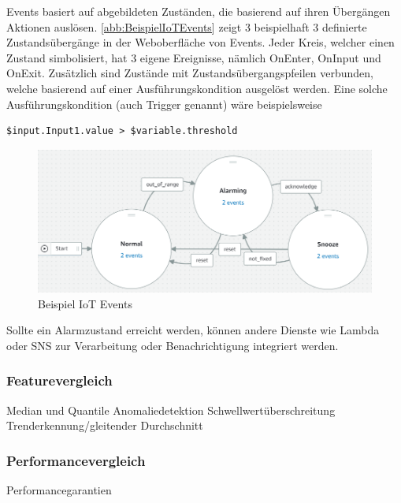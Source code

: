 \AWSIOT Events basiert auf abgebildeten Zuständen, die basierend auf ihren Übergängen Aktionen auslösen. \autoref{abb:BeispielIoTEvents} zeigt 3 beispielhaft 3 definierte Zustandsübergänge in der Weboberfläche von \AWSIOT Events. Jeder Kreis, welcher einen Zustand simbolisiert, hat 3 eigene Ereignisse, nämlich OnEnter, OnInput und OnExit. Zusätzlich sind Zustände mit Zustandsübergangspfeilen verbunden, welche basierend auf einer Ausführungskondition ausgelöst werden. Eine solche Ausführungskondition (auch Trigger genannt) wäre beispielsweise
\begin{lstlisting}
$input.Input1.value > $variable.threshold
\end{lstlisting}
\begin{figure}[H]
\centering
\includegraphics[width=\textwidth]{graphics/IoT-Events-Demo.png}
\caption{Beispiel IoT Events}
\label{abb:BeispielIoTEvents}
\end{figure}
Sollte ein Alarmzustand erreicht werden, können andere Dienste wie Lambda oder \ac{SNS} zur Verarbeitung oder Benachrichtigung integriert werden.

\subsubsection{Featurevergleich}
Median und Quantile
Anomaliedetektion
Schwellwertüberschreitung
Trenderkennung/gleitender Durchschnitt

\subsubsection{Performancevergleich}
Performancegarantien

